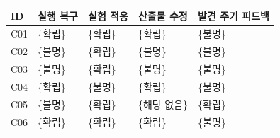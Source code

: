 \begin{tabular}{lp{.20\linewidth}p{.20\linewidth}p{.20\linewidth}p{.20\linewidth}}
\toprule
ID & 실행 복구 & 실험 적응 & 산출물 수정 & 발견 주기 피드백 \\
\midrule
C01 & \{확립\} & \{확립\} & \{확립\} & \{불명\} \\
C02 & \{불명\} & \{확립\} & \{불명\} & \{불명\} \\
C03 & \{불명\} & \{확립\} & \{불명\} & \{불명\} \\
C04 & \{확립\} & \{불명\} & \{확립\} & \{불명\} \\
C05 & \{불명\} & \{확립\} & \{해당 없음\} & \{확립\} \\
C06 & \{확립\} & \{확립\} & \{확립\} & \{불명\} \\
\bottomrule
\end{tabular}
